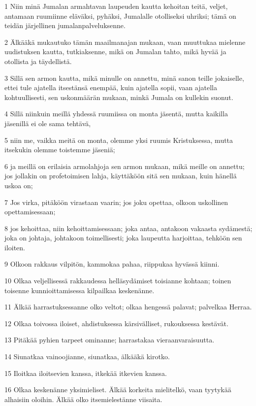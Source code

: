 \par 1 Niin minä Jumalan armahtavan laupeuden kautta kehoitan teitä, veljet, antamaan ruumiinne eläväksi, pyhäksi, Jumalalle otolliseksi uhriksi; tämä on teidän järjellinen jumalanpalveluksenne.
\par 2 Älkääkä mukautuko tämän maailmanajan mukaan, vaan muuttukaa mielenne uudistuksen kautta, tutkiaksenne, mikä on Jumalan tahto, mikä hyvää ja otollista ja täydellistä.
\par 3 Sillä sen armon kautta, mikä minulle on annettu, minä sanon teille jokaiselle, ettei tule ajatella itsestänsä enempää, kuin ajatella sopii, vaan ajatella kohtuullisesti, sen uskonmäärän mukaan, minkä Jumala on kullekin suonut.
\par 4 Sillä niinkuin meillä yhdessä ruumiissa on monta jäsentä, mutta kaikilla jäsenillä ei ole sama tehtävä,
\par 5 niin me, vaikka meitä on monta, olemme yksi ruumis Kristuksessa, mutta itsekukin olemme toistemme jäseniä;
\par 6 ja meillä on erilaisia armolahjoja sen armon mukaan, mikä meille on annettu; jos jollakin on profetoimisen lahja, käyttäköön sitä sen mukaan, kuin hänellä uskoa on;
\par 7 Jos virka, pitäköön virastaan vaarin; jos joku opettaa, olkoon uskollinen opettamisessaan;
\par 8 jos kehoittaa, niin kehoittamisessaan; joka antaa, antakoon vakaasta sydämestä; joka on johtaja, johtakoon toimellisesti; joka laupeutta harjoittaa, tehköön sen iloiten.
\par 9 Olkoon rakkaus vilpitön, kammokaa pahaa, riippukaa hyvässä kiinni.
\par 10 Olkaa veljellisessä rakkaudessa helläsydämiset toisianne kohtaan; toinen toisenne kunnioittamisessa kilpailkaa keskenänne.
\par 11 Älkää harrastuksessanne olko veltot; olkaa hengessä palavat; palvelkaa Herraa.
\par 12 Olkaa toivossa iloiset, ahdistuksessa kärsivälliset, rukouksessa kestävät.
\par 13 Pitäkää pyhien tarpeet ominanne; harrastakaa vieraanvaraisuutta.
\par 14 Siunatkaa vainoojianne, siunatkaa, älkääkä kirotko.
\par 15 Iloitkaa iloitsevien kanssa, itkekää itkevien kanssa.
\par 16 Olkaa keskenänne yksimieliset. Älkää korkeita mielitelkö, vaan tyytykää alhaisiin oloihin. Älkää olko itsemielestänne viisaita.
